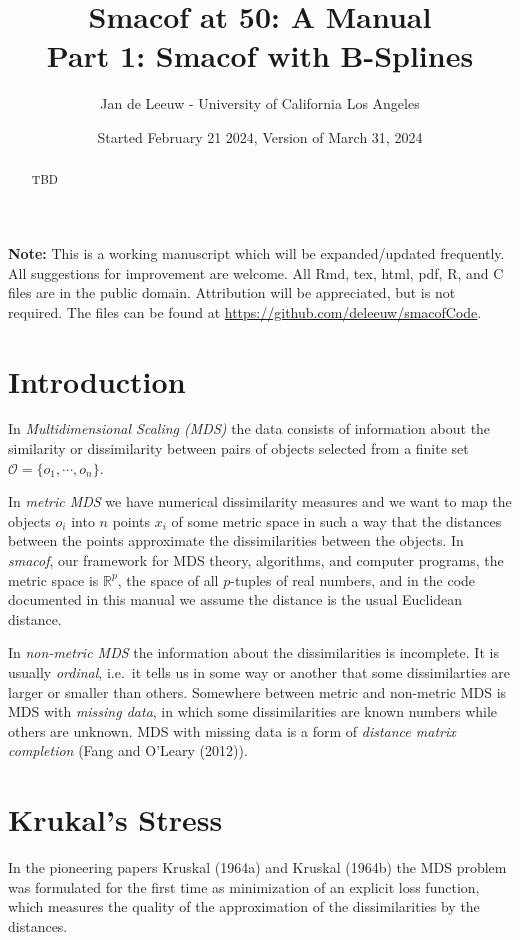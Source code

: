 \documentclass[
  12pt,
]{article}
\title{Smacof at 50: A Manual\\
Part 1: Smacof with B-Splines}
\author{Jan de Leeuw - University of California Los Angeles}
\date{Started February 21 2024, Version of March 31, 2024}
\newcommand{\sectionbreak}{\clearpage}
\begin{document}
\maketitle
\begin{abstract}
TBD
\end{abstract}

{
\setcounter{tocdepth}{4}
\tableofcontents
}
\textbf{Note:} This is a working manuscript which will be expanded/updated
frequently. All suggestions for improvement are welcome. All Rmd, tex,
html, pdf, R, and C files are in the public domain. Attribution will be
appreciated, but is not required. The files can be found at
\url{https://github.com/deleeuw/smacofCode}.

\sectionbreak

\section{Introduction}\label{introduction}

In \emph{Multidimensional Scaling (MDS)} the data consists of information
about the similarity or dissimilarity between pairs of objects selected
from a finite set \(\mathcal{O}=\{o_1,\cdots,o_n\}\).

In \emph{metric MDS} we have numerical dissimilarity measures and we want to
map the objects \(o_i\) into \(n\) points \(x_i\) of some metric space in such
a way that the distances between the points approximate the
dissimilarities between the objects. In \emph{smacof}, our framework for MDS
theory, algorithms, and computer programs, the metric space is
\(\mathbb{R}^p\), the space of all \(p\)-tuples of real numbers, and in the
code documented in this manual we assume the distance is the usual
Euclidean distance.

In \emph{non-metric MDS} the information about the dissimilarities is
incomplete. It is usually \emph{ordinal}, i.e.~it tells us in some way or
another that some dissimilarties are larger or smaller than others.
Somewhere between metric and non-metric MDS is MDS with \emph{missing data},
in which some dissimilarities are known numbers while others are
unknown. MDS with missing data is a form of \emph{distance matrix completion}
(Fang and O'Leary (2012)).

\section{Krukal's Stress}\label{krukals-stress}

In the pioneering papers Kruskal (1964a) and Kruskal (1964b) the MDS problem
was formulated for the first time as minimization of an explicit loss
function, which measures the quality of the approximation of the
dissimilarities by the distances.
\end{document}
